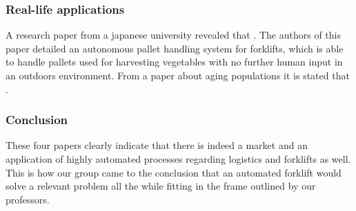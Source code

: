 \documentclass[../report.tex]{subfiles}
\begin{document}
    \subsubsection{Real-life applications}
    A research paper from a japanese university revealed 
    that \cite[in countries with aging demographics autonomous 
    vehicles such as an autonomous forklift are required 
    to lighten the burden on manpower and manual labor]{pallet_handling}. 
    The authors of this paper detailed an autonomous pallet 
    handling system for forklifts, which is able to handle 
    pallets used for harvesting vegetables with no further 
    human input in an outdoors environment.
    From a paper about aging populations it is stated that 
    \cite[11\% of the world is over 60 years of age and this ratio 
    is expected to rise up to 22\% in 2050]{aging_population}.

    \subsubsection{Conclusion}
    These four papers clearly indicate that there is indeed 
    a market and an application of highly automated processes
    regarding logistics and forklifts as well. This is how
    our group came to the conclusion that an automated
    forklift would solve a relevant problem all the while 
    fitting in the frame outlined by our professors. 
\end{document}
